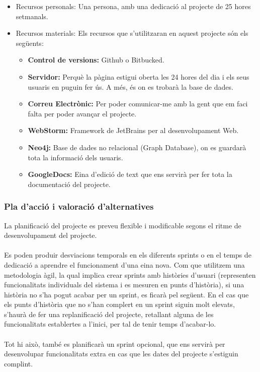 \documentclass[11pt,catalan,listoffigures,listoftables]{tfgetsinf}
\begin{document}
\begin{itemize}
	\item Recursos personals: Una persona, amb una dedicació al projecte de 25 hores setmanals.
	\item Recursos materials: Els recursos que s’utilitzaran en aquest projecte són els següents:
	\begin{itemize}
		\item \textbf{Control de versions:} Github o Bitbucked.
		\item \textbf{Servidor:} Perquè la pàgina estigui oberta les 24 hores del dia i els seus usuaris en puguin fer ús. A més, és on es trobarà la base de dades.
		\item \textbf{Correu Electrònic:} Per poder comunicar-me amb la gent que em faci falta per poder avançar el projecte.
		\item \textbf{WebStorm:} Framework de JetBrains per al desenvolupament Web.
		\item \textbf{Neo4j:} Base de dades no relacional (Graph Database), on es guardarà tota la informació dels usuaris.
		\item \textbf{GoogleDocs:} Eina d’edició de text que ens servirà per fer tota la documentació del projecte.
	\end{itemize}
\end{itemize}

\subsubsection{Pla d’acció i valoració d’alternatives}

La planificació del projecte es preveu flexible i modificable segons el ritme de desenvolupament del projecte.\\ \\
Es poden produir desviacions temporals en els diferents sprints o en el temps de dedicació a aprendre el funcionament d’una eina nova. Com que utilitzem una metodologia àgil, la qual implica crear sprints amb històries d’usuari (representen funcionalitats individuals del sistema i es mesuren en punts d’història), si una història no s’ha pogut acabar per un sprint, es ficarà pel següent. En el cas que els punts d’història que no s’han complert en un sprint siguin molt elevats, s’haurà de fer una replanificació del projecte, retallant alguna de les funcionalitats establertes a l’inici, per tal de tenir temps d’acabar-lo.\\ \\
Tot hi això, també es planificarà un sprint opcional, que ens servirà per desenvolupar funcionalitats extra en cas que les dates del projecte s’estiguin complint.
\end{document}
